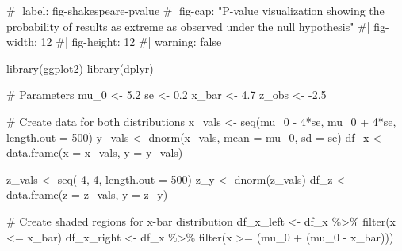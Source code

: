 \documentclass[
  letterpaper,
  DIV=11,
  numbers=noendperiod]{scrreprt}
\newenvironment{Shaded}{\begin{snugshade}}{\end{snugshade}}
\newcommand{\AttributeTok}[1]{\textcolor[rgb]{0.40,0.45,0.13}{#1}}
\newcommand{\CommentTok}[1]{\textcolor[rgb]{0.37,0.37,0.37}{#1}}
\newcommand{\DecValTok}[1]{\textcolor[rgb]{0.68,0.00,0.00}{#1}}
\newcommand{\FloatTok}[1]{\textcolor[rgb]{0.68,0.00,0.00}{#1}}
\newcommand{\FunctionTok}[1]{\textcolor[rgb]{0.28,0.35,0.67}{#1}}
\newcommand{\NormalTok}[1]{\textcolor[rgb]{0.00,0.23,0.31}{#1}}
\newcommand{\OtherTok}[1]{\textcolor[rgb]{0.00,0.23,0.31}{#1}}
\newcommand{\SpecialCharTok}[1]{\textcolor[rgb]{0.37,0.37,0.37}{#1}}
\begin{document}
\begin{Shaded}
\begin{Highlighting}[]
\CommentTok{\#| label: fig{-}shakespeare{-}pvalue}
\CommentTok{\#| fig{-}cap: "P{-}value visualization showing the probability of results as extreme as observed under the null hypothesis"}
\CommentTok{\#| fig{-}width: 12}
\CommentTok{\#| fig{-}height: 12}
\CommentTok{\#| warning: false}

\FunctionTok{library}\NormalTok{(ggplot2)}
\FunctionTok{library}\NormalTok{(dplyr)}

\CommentTok{\# Parameters}
\NormalTok{mu\_0 }\OtherTok{\textless{}{-}} \FloatTok{5.2}
\NormalTok{se }\OtherTok{\textless{}{-}} \FloatTok{0.2}
\NormalTok{x\_bar }\OtherTok{\textless{}{-}} \FloatTok{4.7}
\NormalTok{z\_obs }\OtherTok{\textless{}{-}} \SpecialCharTok{{-}}\FloatTok{2.5}

\CommentTok{\# Create data for both distributions}
\NormalTok{x\_vals }\OtherTok{\textless{}{-}} \FunctionTok{seq}\NormalTok{(mu\_0 }\SpecialCharTok{{-}} \DecValTok{4}\SpecialCharTok{*}\NormalTok{se, mu\_0 }\SpecialCharTok{+} \DecValTok{4}\SpecialCharTok{*}\NormalTok{se, }\AttributeTok{length.out =} \DecValTok{500}\NormalTok{)}
\NormalTok{y\_vals }\OtherTok{\textless{}{-}} \FunctionTok{dnorm}\NormalTok{(x\_vals, }\AttributeTok{mean =}\NormalTok{ mu\_0, }\AttributeTok{sd =}\NormalTok{ se)}
\NormalTok{df\_x }\OtherTok{\textless{}{-}} \FunctionTok{data.frame}\NormalTok{(}\AttributeTok{x =}\NormalTok{ x\_vals, }\AttributeTok{y =}\NormalTok{ y\_vals)}

\NormalTok{z\_vals }\OtherTok{\textless{}{-}} \FunctionTok{seq}\NormalTok{(}\SpecialCharTok{{-}}\DecValTok{4}\NormalTok{, }\DecValTok{4}\NormalTok{, }\AttributeTok{length.out =} \DecValTok{500}\NormalTok{)}
\NormalTok{z\_y }\OtherTok{\textless{}{-}} \FunctionTok{dnorm}\NormalTok{(z\_vals)}
\NormalTok{df\_z }\OtherTok{\textless{}{-}} \FunctionTok{data.frame}\NormalTok{(}\AttributeTok{z =}\NormalTok{ z\_vals, }\AttributeTok{y =}\NormalTok{ z\_y)}

\CommentTok{\# Create shaded regions for x{-}bar distribution}
\NormalTok{df\_x\_left }\OtherTok{\textless{}{-}}\NormalTok{ df\_x }\SpecialCharTok{\%\textgreater{}\%} \FunctionTok{filter}\NormalTok{(x }\SpecialCharTok{\textless{}=}\NormalTok{ x\_bar)}
\NormalTok{df\_x\_right }\OtherTok{\textless{}{-}}\NormalTok{ df\_x }\SpecialCharTok{\%\textgreater{}\%} \FunctionTok{filter}\NormalTok{(x }\SpecialCharTok{\textgreater{}=}\NormalTok{ (mu\_0 }\SpecialCharTok{+}\NormalTok{ (mu\_0 }\SpecialCharTok{{-}}\NormalTok{ x\_bar)))}


\end{Highlighting}
\end{Shaded}
\end{document}

